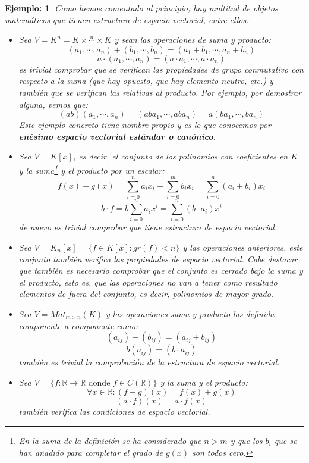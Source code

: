 \documentclass[10pt,a4paper,openright]{book}
\theoremstyle{break}
\newtheorem*{ej}{\underline{Ejemplo}:}
\begin{document}
\begin{ej}
Como hemos comentado al principio, hay multitud de objetos matemáticos que tienen estructura de espacio vectorial, entre ellos:
\begin{itemize}
\item Sea $V=K^n=K \times  \stackrel{n}{\cdots} \times K$ y sean las operaciones de suma y producto:
$$
(a_1, \cdots, a_n)+(b_1, \cdots, b_n)=(a_1+b_1, \cdots, a_n+ b_n)
$$
$$
a \cdot (a_1, \cdots, a_n)=(a\cdot a_1, \cdots, a\cdot a_n)
$$
es trivial comprobar que se verifican las propiedades de grupo conmutativo con respecto a la suma (que hay opuesto, que hay elemento neutro, etc.) y también que se verifican las relativas al producto. Por ejemplo, por demostrar alguna, vemos que:
$$(ab)(a_1, \cdots, a_n)=(aba_1, \cdots, aba_n)=a(ba_1, \cdots, ba_n)$$
Este ejemplo concreto tiene nombre propio y es lo que conocemos por \textbf{enésimo espacio vectorial estándar o canónico}.

\item Sea $V=K[x]$, es decir, el conjunto de los polinomios con coeficientes en $K$ y la suma\footnote{En la suma de la definición se ha considerado que $n> m$ y que los $b_i$ que se han añadido para completar el grado de $g(x)$ son todos cero.} y el producto por un escalar:
$$
f(x)+g(x) = \sum_{i=0}^n a_i x_i  + \sum_{i=0}^m b_i x_i = \sum_{i=0}^n (a_i + b_i) x_i
$$
$$
b\cdot f = b\sum_{i=0}^n a_ix^i=\sum_{i=0}^n (b\cdot a_i)x^i
$$
de nuevo es trivial comprobar que tiene estructura de espacio vectorial.

\item Sea $V=K_n[x]=\{f\in K[x]: gr(f)<n\}$ y las operaciones anteriores, este conjunto también verifica las propiedades de espacio vectorial. Cabe destacar que también  es necesario comprobar que el conjunto es cerrado bajo la suma y el producto, esto es, que las operaciones no van a tener como resultado elementos de fuera del conjunto, es decir, polinomios de mayor grado.

\item Sea $V=Mat_{m\times n}(K)$ y las operaciones suma y producto las definida componente a componente como:
$$
(a_{ij})+(b_{ij})=(a_{ij}+b_{ij})
$$
$$
b(a_{ij})=(b\cdot a_{ij})
$$
también es trivial la comprobación de la estructura de espacio vectorial.

\item Sea $V=\{f: \mathbb R\rightarrow \mathbb R \mbox{ donde } f\in C(\mathbb{R})\}$ y la suma y el producto:
$$
\forall x\in \mathbb{R} : (f+g)(x)=f(x)+g(x)
$$
$$
(a\cdot f)(x)=a\cdot f(x)
$$
también verifica las condiciones de espacio vectorial.
\end{itemize}
\end{ej}
\end{document}
